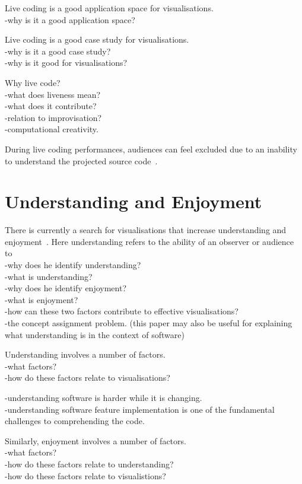 Live coding is a good application space for visualisations.\\
-why is it a good application space?

Live coding is a good case study for visualisations.\\
-why is it a good case study?\\
-why is it good for visualisations?

Why live code?\\
-what does liveness mean? \cite{Auslander}\\
-what does it contribute?\\
-relation to improvisation?\\
-computational creativity. \cite{Mclean}

During live coding performances, audiences can feel excluded due to an inability to understand the projected source code~\cite{McLean2010a}.

\section{Understanding and Enjoyment}

There is currently a search for visualisations that increase understanding and enjoyment~\cite{McLean2010a}. Here understanding refers to the ability of an observer or audience to \\
-why does he identify understanding?\\
-what is understanding?\\
-why does he identify enjoyment?\\
-what is enjoyment?\\
-how can these two factors contribute to effective visualisations?\\
-the concept assignment problem. \cite{Biggerstaff1994} (this paper may also be useful for explaining what understanding is in the context of software)

Understanding involves a number of factors.\\
-what factors?\\
-how do these factors relate to visualisations?

-understanding software is harder while it is changing. \cite{Eisenbarth2003}\\
-understanding software feature implementation is one of the fundamental challenges to comprehending the code.\cite{Eisenbarth2003}

Similarly, enjoyment involves a number of factors.\\
-what factors?\\
-how do these factors relate to understanding?\\
-how do these factors relate to visualistions?


